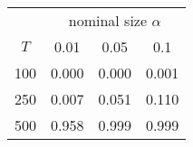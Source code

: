 % 
\begin{tabular}{cccc}
  \hline
  & \multicolumn{3}{c}{nominal size $\alpha$} \\
 $T$ & 0.01 & 0.05 & 0.1 \\
 \hline
100 & 0.000 & 0.000 & 0.001 \\ 
  250 & 0.007 & 0.051 & 0.110 \\ 
  500 & 0.958 & 0.999 & 0.999 \\ 
   \hline
\end{tabular}
